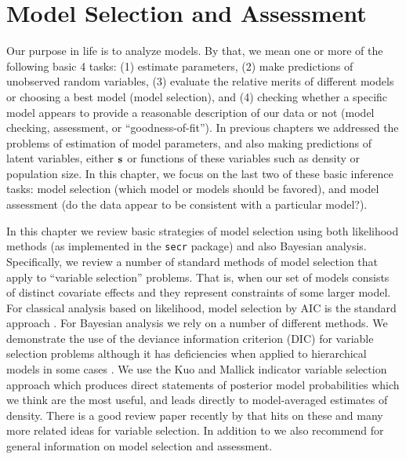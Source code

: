 \chapter{
Model Selection and Assessment
}
\label{chapt.gof}

\vspace{.3in}

Our purpose in life is to analyze models. By that, we mean one or more
of the following basic 4 tasks: (1) estimate parameters, (2) make predictions
of unobserved random variables, (3) evaluate the
relative merits of different models or choosing a best model (model
selection), and (4)  checking whether a specific model appears to provide a
reasonable description of our data or not (model checking, assessment,
or ``goodness-of-fit'').  In previous chapters we
addressed the problems of estimation of model parameters, 
and also making
predictions of latent variables, either ${\bf s}$ or
functions of these variables such as density or population size.
In this chapter, we focus on the last two of these basic
inference tasks: model selection (which model or models should be
favored), and model assessment (do the data appear to be consistent
with a particular model?).


In this chapter we review  basic strategies of model selection 
using both likelihood methods (as
implemented in the \mbox{\tt secr} package) and also Bayesian
analysis.
Specifically,
we review a number of standard methods of model selection that apply
to ``variable selection'' problems. That is, when our set of models
consists of distinct covariate effects and they represent constraints
of some larger model.
For classical analysis based on likelihood, model selection by
AIC is the standard approach \citep{burnham_anderson:2002}.  For
Bayesian analysis we rely on a number of different methods.  We
demonstrate the use of the deviance information criterion (DIC)
\citep{spiegelhalter_etal:2002} for variable selection problems
although it has deficiencies when applied to hierarchical models in
some cases \citep{millar:2009}. 
We use the
Kuo and Mallick indicator variable selection approach
\citep{kuo_mallick:1998} which
produces direct statements
of posterior model probabilities which we think are the most useful,
and leads directly to model-averaged estimates of density.  There is a
good review paper recently by \citet{ohara_sillanpaa:2009} that hits
on these and many more related ideas for variable selection.
 In addition to \citet{ohara_sillanpaa:2009} we
also recommend \citet[][Chapt. 7]{link_barker:2010} for general
information on model selection and assessment.

